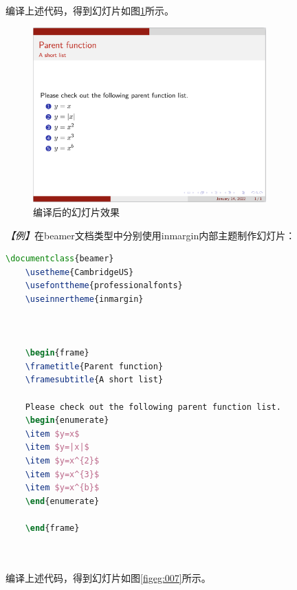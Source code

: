 编译上述代码，得到幻灯片如图\ref{figeg:006}所示。

\begin{figure}[htbp]
    \centering
    \includegraphics[width = 0.8\textwidth]{images/ch_9/example_innertheme_circles.png}
    \caption{编译后的幻灯片效果}
    \label{figeg:006}
\end{figure}

\emph{【例】}在beamer文档类型中分别使用inmargin内部主题制作幻灯片：
\begin{lstlisting}[language=TeX]
    \documentclass{beamer}
    \usetheme{CambridgeUS}
    \usefonttheme{professionalfonts}
    \useinnertheme{inmargin}

    

    \begin{frame}
    \frametitle{Parent function}
    \framesubtitle{A short list}

    Please check out the following parent function list.
    \begin{enumerate}
    \item $y=x$
    \item $y=|x|$
    \item $y=x^{2}$
    \item $y=x^{3}$
    \item $y=x^{b}$
    \end{enumerate}

    \end{frame}

    
\end{lstlisting}

编译上述代码，得到幻灯片如图\ref{figeg:007}所示。

